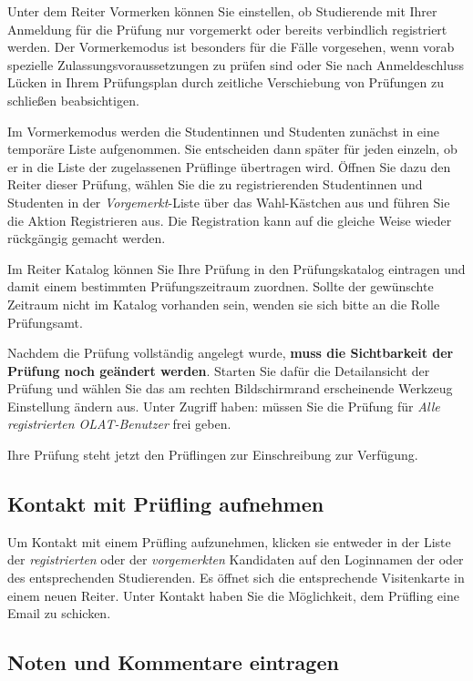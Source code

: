 \documentclass[a4paper,11pt]{article}
\newcommand{\knopf}[1]{{\sc #1}}
\begin{document}
Unter dem Reiter \knopf{Vormerken} können Sie einstellen, ob Studierende mit
Ihrer Anmeldung für die Prüfung nur vorgemerkt oder bereits verbindlich
registriert werden.  Der Vormerkemodus ist besonders für die Fälle vorgesehen,
wenn vorab spezielle Zulassungsvoraussetzungen zu prüfen sind oder Sie nach
Anmeldeschluss Lücken in Ihrem Prüfungsplan durch zeitliche Verschiebung von
Prüfungen zu schließen beabsichtigen.  

Im Vormerkemodus werden die Studentinnen und Studenten zunächst in eine temporäre
Liste aufgenommen. Sie entscheiden dann später für jeden einzeln,
ob er in die Liste der zugelassenen Prüflinge übertragen wird.
Öffnen Sie dazu den Reiter dieser Prüfung, wählen Sie die zu registrierenden
Studentinnen und Studenten in der {\em Vorgemerkt}-Liste über das Wahl-Kästchen aus und führen
Sie die Aktion \knopf{Registrieren} aus. Die Registration kann auf die gleiche
Weise wieder rückgängig gemacht werden.

Im Reiter \knopf{Katalog} können Sie Ihre Prüfung in den Prüfungskatalog
eintragen und damit einem bestimmten Prüfungszeitraum zuordnen.  Sollte der
gewünschte Zeitraum nicht im Katalog vorhanden sein, wenden sie sich bitte an
die Rolle Prüfungsamt.

Nachdem die Prüfung vollständig angelegt wurde, {\bf muss die Sichtbarkeit der
  Prüfung noch geändert werden}. Starten Sie dafür die \knopf{Detailansicht}
der Prüfung und wählen Sie das am rechten Bildschirmrand erscheinende Werkzeug
\knopf{Einstellung ändern} aus. Unter \knopf{Zugriff haben:} müssen Sie die
Prüfung für {\em Alle registrierten OLAT-Benutzer} frei geben.  

Ihre Prüfung steht jetzt den Prüflingen zur Einschreibung zur Verfügung.

\subsection{Kontakt mit Prüfling aufnehmen}

Um Kontakt mit einem Prüfling aufzunehmen, klicken sie entweder in der Liste
der {\em registrierten} oder der {\em vorgemerkten} Kandidaten auf den
Loginnamen der oder des entsprechenden Studierenden. Es öffnet sich die
entsprechende \knopf{Visitenkarte} in einem neuen Reiter. Unter
\knopf{Kontakt} haben Sie die Möglichkeit, dem Prüfling eine Email zu
schicken.

\subsection{Noten und Kommentare eintragen}
\end{document}
